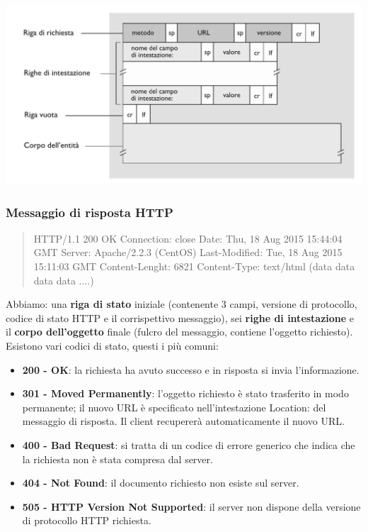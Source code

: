 \includegraphics[width=\textwidth]{./img/richiestaHTTP.png}

\subsubsection*{Messaggio di risposta HTTP}
\begin{quote}
  HTTP/1.1 200 OK
  Connection: close \newline
  Date: Thu, 18 Aug 2015 15:44:04 GMT \newline
  Server: Apache/2.2.3 (CentOS) \newline
  Last-Modified: Tue, 18 Aug 2015 15:11:03 GMT \newline
  Content-Lenght: 6821 \newline
  Content-Type: text/html \newline
  (data data data data ....)
\end{quote}

Abbiamo: una \textbf{riga di stato} iniziale (contenente 3 campi, versione di protocollo, codice di stato HTTP e il corrispettivo messaggio), sei \textbf{righe di intestazione} e il \textbf{corpo dell'oggetto} finale (fulcro del messaggio, contiene l'oggetto richiesto). \newline
Esistono vari codici di stato, questi i più comuni:
\begin{itemize}
  \item \textbf{200 - OK}: la richiesta ha avuto successo e in risposta si invia l’informazione.
  \item \textbf{301 - Moved Permanently}: l’oggetto richiesto è stato trasferito in modo permanente; il nuovo URL è specificato nell’intestazione Location: del messaggio di risposta. Il client recupererà automaticamente il nuovo URL.
  \item \textbf{400 - Bad Request}: si tratta di un codice di errore generico che indica che la richiesta non è stata compresa dal server.
  \item \textbf{404 - Not Found}: il documento richiesto non esiste sul server.
  \item \textbf{505 - HTTP Version Not Supported}: il server non dispone della versione di protocollo HTTP richiesta.
\end{itemize}

